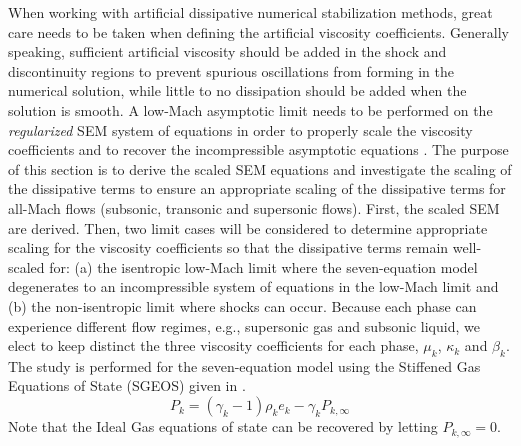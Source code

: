 \documentclass[preprint,10pt]{elsarticle}
\begin{document}
When working with artificial dissipative numerical stabilization methods, great care needs to be taken when defining the artificial 
viscosity coefficients. Generally speaking, sufficient artificial viscosity should be added in the shock and discontinuity regions 
to prevent spurious oscillations from forming in the numerical solution, while little to no dissipation should be added when the solution is smooth.
A low-Mach asymptotic limit needs to be performed on the {\it regularized} SEM system of equations in order to properly scale the viscosity 
coefficients and to recover the incompressible asymptotic equations \cite{LowMach1, LowMach2, LowMach3}. The purpose of this section is to 
derive the scaled SEM equations and investigate the scaling of the dissipative terms to ensure an appropriate scaling of the dissipative 
terms for all-Mach flows (subsonic, transonic and supersonic flows). First, the scaled SEM are derived. Then, two limit cases will be considered to determine appropriate scaling for the 
viscosity coefficients so that the dissipative terms remain well-scaled for: 
(a) the isentropic low-Mach limit where the seven-equation model degenerates to an incompressible system of 
equations in the low-Mach limit and (b) the non-isentropic limit where shocks can occur. 
Because each phase can experience different flow regimes, e.g., supersonic gas and subsonic liquid, we elect to keep distinct the three viscosity coefficients for each phase, $\mu_k$, $\kappa_k$ and $\beta_k$. The study is performed for the seven-equation model using the Stiffened Gas Equations of State (SGEOS) given in .
%
\begin{equation}\label{eq:SGEOS_bis}
P_k = \left( \gamma_k-1 \right) \rho_k e_k - \gamma_k P_{k,\infty}
\end{equation}
Note that the Ideal Gas equations of state can be recovered by letting $P_{k,\infty}=0$.
%
\end{document}

